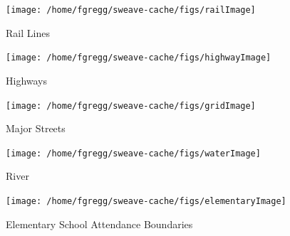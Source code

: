 \documentclass[12pt,letter]{article}\usepackage[]{graphicx}\usepackage[]{color}
\newenvironment{knitrout}{}{} %
\begin{document}
\begin{figure}
\begin{knitrout}
\color{fgcolor}

{\centering \texttt{[image: /home/fgregg/sweave-cache/figs/railImage]} 

}



\end{knitrout}

\caption{Rail Lines}
\end{figure}

\begin{figure}
\begin{knitrout}
\color{fgcolor}

{\centering \texttt{[image: /home/fgregg/sweave-cache/figs/highwayImage]} 

}



\end{knitrout}

\caption{Highways}
\end{figure}

\begin{figure}
\begin{knitrout}
\color{fgcolor}

{\centering \texttt{[image: /home/fgregg/sweave-cache/figs/gridImage]} 

}



\end{knitrout}

\caption{Major Streets}
\end{figure}

\begin{figure}
\begin{knitrout}
\color{fgcolor}

{\centering \texttt{[image: /home/fgregg/sweave-cache/figs/waterImage]} 

}



\end{knitrout}

\caption{River}
\end{figure}

\begin{figure}
\begin{knitrout}
\color{fgcolor}

{\centering \texttt{[image: /home/fgregg/sweave-cache/figs/elementaryImage]} 

}



\end{knitrout}

\caption{Elementary School Attendance Boundaries}
\end{figure}
\end{document}
